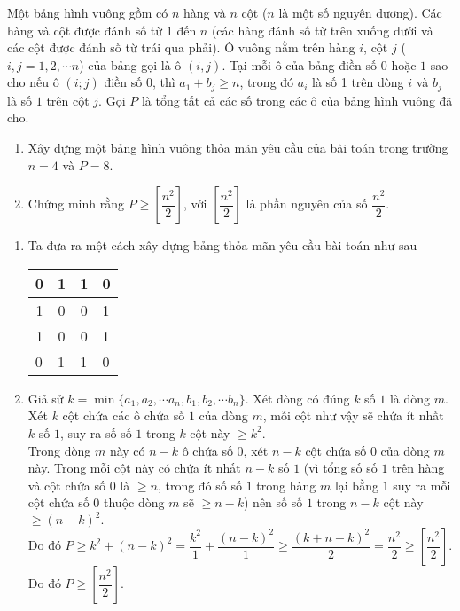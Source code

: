 \begin{ex}%
 	Một bảng hình vuông gồm có $n$ hàng và $n$ cột ($n$ là một số nguyên dương). Các hàng và cột được đánh số từ $1$ đến $n$ (các hàng đánh số từ trên xuống dưới và các cột được đánh số từ trái qua phải). Ô vuông nằm trên hàng $i$, cột $j$ ($i,j =1,2, \cdots n$) của bảng gọi là ô $(i,j)$. Tại mỗi ô của bảng điền số $0$ hoặc $1$ sao cho nếu ô $(i;j)$ điền số $0$, thì $a_1+b_j \geq n$, trong đó $a_i$ là số 1 trên dòng $i$ và $b_j$ là số $1$ trên cột $j$. Gọi $P$ là tổng tất cả các số trong các ô của bảng hình vuông đã cho.
 	\begin{enumerate}
 		\item Xây dựng một bảng hình vuông thỏa mãn yêu cầu của bài toán trong trường $n=4$ và $P=8.$
 		\item Chứng minh rằng $P \geq \left[ \dfrac{n^2}{2}\right]$, với $\left[ \dfrac{n^2}{2}\right]$ là phần nguyên của số $\dfrac{n^2}{2}$. 
 	\end{enumerate}
\loigiai
{ \begin{enumerate}
		\item Ta đưa ra một cách xây dựng bảng thỏa mãn yêu cầu bài toán như sau
		\begin{center}
			\begin{tabular}{|c|c|c|l|}
				\hline
				0                       & 1                      & 1                      & 0 \\ \hline
				1                       & 0                      & 0                      & 1 \\ \hline
				1                       & 0                      & 0                      & 1 \\ \hline
				\multicolumn{1}{|l|}{0} & \multicolumn{1}{l|}{1} & \multicolumn{1}{l|}{1} & 0 \\ \hline
			\end{tabular}
		\end{center}
	\item Giả sử $k=\min \{a_1,a_2, \cdots a_n, b_1, b_2, \cdots b_n \}$. Xét dòng có đúng $k$ số $1$ là dòng  $m$.\\
	Xét $k$ cột chứa các ô chứa số $1$ của dòng $m$, mỗi cột như vậy sẽ chứa ít nhất $k$ số $1$, suy ra số số $1$ trong $k$ cột này $\geq k^2$.\\
	Trong dòng $m$ này có $n-k$ ô chứa số $0$, xét $n-k$ cột chứa số $0$ của dòng $m$ này. Trong mỗi cột này có chứa ít nhất $n-k$ số $1$ (vì tổng số số $1$ trên hàng và cột chứa số $0$ là $ \geq n$, trong đó số số $1$ trong hàng $m$ lại bằng $1$ suy ra mỗi cột chứa số $0$ thuộc dòng $m$ sẽ $\geq n-k$) nên số số $1$ trong $n-k$ cột này $\geq (n-k)^2.$\\
	Do đó $P \geq k^2+(n-k)^2=\dfrac{k^2}{1}+\dfrac{(n-k)^2}{1}\geq \dfrac{(k+n-k)^2}{2}=\dfrac{n^2}{2} \geq \left[ \dfrac{n^2}{2}\right]$. Do đó $P \geq \left[ \dfrac{n^2}{2}\right].$
	\end{enumerate}
	
}
\end{ex}


